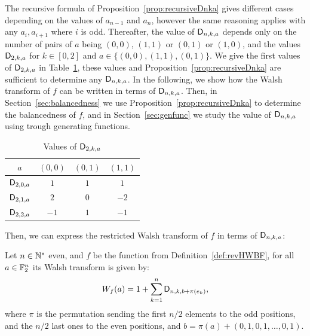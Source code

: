 \documentclass[11pt]{llncs}
\begin{document}
The recursive formula of Proposition~\ref{prop:recursiveDnka} gives different cases depending on the values of $a_{n-1}$ and $a_n$, however the same reasoning applies with any $a_i, a_{i+1}$ where $i$ is odd. 
Thereafter, the value of $\mathsf{D}_{n,k,a}$ depends only on the number of pairs of $a$ being $(0,0)$, $(1,1)$ or $(0,1)$ or $(1,0)$, and the values $\mathsf{D}_{2,k,a}$ for $k \in [0,2]$ and $a \in \{ (0,0),(1,1),(0,1)\}$. 
We give the first values of $\mathsf{D}_{2,k,a}$ in Table~\ref{tab:Dnka},  these values and Proposition~\ref{prop:recursiveDnka} are sufficient to determine any $\mathsf{D}_{n,k,a}$. 
In the following, we show how the Walsh transform of $f$ can be written in terms of $\mathsf{D}_{n,k,a}$. Then, in Section~\ref{sec:balancedness} we use Proposition~\ref{prop:recursiveDnka} to determine the balancedness of $f$, and in Section~\ref{sec:genfunc} we study the value of $\mathsf{D}_{n,k,a}$ using trough generating functions.





\begin{table}[H]
	\centering
	\begin{tabular}{|c|c|c|c|}
		\hline
		$a$ & $(0,0)$ & $(0,1)$ & $(1,1)$ \\ \hline
		$\mathsf{D}_{2,0,a}$ &$1$&$1$ & $1$\\ \hline
		$\mathsf{D}_{2,1,a}$ &$2$& $0$ & $-2$\\ \hline
		$\mathsf{D}_{2,2,a}$ &$-1$&$1$ & $-1$\\ \hline
	\end{tabular}
	\caption{Values of $\mathsf{D}_{2,k,a}$}\label{tab:Dnka}
\end{table}



Then, we can express the restricted Walsh transform of $f$ in terms of $\mathsf{D}_{n,k,a}$:


\begin{proposition}\label{prop:WT}
	Let $n \in \mathbb{N}^*$ even, and $f$ be the function from Definition~\ref{def:revHWBF}, for all $a\in \mathbb{F}_2^n$ its Walsh transform is given by:
	\[ W_{f}(a)=1+\sum_{k=1}^n \mathsf{D}_{n,k,b+\pi(e_k)},\]
where $\pi$ is the permutation sending the first $n/2$ elements to the odd positions, and the $n/2$ last ones to the even positions, and $b=\pi(a)+(0,1,0,1,\ldots,0,1)$.
\end{proposition}
\end{document}

